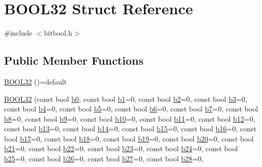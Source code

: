 \hypertarget{struct_b_o_o_l32}{}\section{B\+O\+O\+L32 Struct Reference}
\label{struct_b_o_o_l32}


{\ttfamily \#include $<$bitbool.\+h$>$}

\subsection*{Public Member Functions}
\begin{DoxyCompactItemize}
\item 
\hyperlink{struct_b_o_o_l32_ab77067628ae79e5356d4d07379defee4}{B\+O\+O\+L32} ()=default
\item 
\hyperlink{struct_b_o_o_l32_a5c3dbffb73954a8f6e118b071893c8df}{B\+O\+O\+L32} (const bool \hyperlink{struct_b_o_o_l32_a695f2ea79d7f3143cefe5391ee1ca0bc}{b0}, const bool \hyperlink{struct_b_o_o_l32_a7e9669f351570749facee83d076f9bc0}{b1}=0, const bool \hyperlink{struct_b_o_o_l32_a640276807605e096aad087624eb203d6}{b2}=0, const bool \hyperlink{struct_b_o_o_l32_a480f658333eb1eed7f831bd4d36beeb5}{b3}=0, const bool \hyperlink{struct_b_o_o_l32_abe1252ff43beedc42e030a2186f52de7}{b4}=0, const bool \hyperlink{struct_b_o_o_l32_a399fa4b7132061ae10294e80a53a2829}{b5}=0, const bool \hyperlink{struct_b_o_o_l32_a261bb3f36714d66a0f49af0fc2aff1a3}{b6}=0, const bool \hyperlink{struct_b_o_o_l32_a8b6f23bb5831d6e4da5efd5ffbfabfef}{b7}=0, const bool \hyperlink{struct_b_o_o_l32_a8904bddd286d03287c00c64ce331cfec}{b8}=0, const bool \hyperlink{struct_b_o_o_l32_aa20759c864674ee2b2b5370a5eac753d}{b9}=0, const bool \hyperlink{struct_b_o_o_l32_a405fbb96cd9be504fc3ad6b46d663ed0}{b10}=0, const bool \hyperlink{struct_b_o_o_l32_abb5f609784efd1ce95411de3dc711256}{b11}=0, const bool \hyperlink{struct_b_o_o_l32_a94c02cc91134cb40f4891f99991c0169}{b12}=0, const bool \hyperlink{struct_b_o_o_l32_aa9b6491afa3cb93436211ead5dd72757}{b13}=0, const bool \hyperlink{struct_b_o_o_l32_a1dc97f98eebbfbba891b0685d80530a0}{b14}=0, const bool \hyperlink{struct_b_o_o_l32_aa8c7112f2b0e1a8cc5ce8f9539b7d245}{b15}=0, const bool \hyperlink{struct_b_o_o_l32_a6e5640d7a5ba9ece502f2b5b9a2349c3}{b16}=0, const bool \hyperlink{struct_b_o_o_l32_a954eb2fcf4d281b206d8e99ba1740ee9}{b17}=0, const bool \hyperlink{struct_b_o_o_l32_ae0a4d950647d4fac9cb20f7e29516bc6}{b18}=0, const bool \hyperlink{struct_b_o_o_l32_aefb41a8da65649ab100c79563185fb72}{b19}=0, const bool \hyperlink{struct_b_o_o_l32_aff33443afd6538991cf18479f3869adb}{b20}=0, const bool \hyperlink{struct_b_o_o_l32_a74c9adb5c81e2174331072bca9318e31}{b21}=0, const bool \hyperlink{struct_b_o_o_l32_afdbfecb548cd8afe357ee6bebfbb324d}{b22}=0, const bool \hyperlink{struct_b_o_o_l32_a952f91aa93fd5d7aade9a56845dc4de6}{b23}=0, const bool \hyperlink{struct_b_o_o_l32_a193404178c473bf772487056eda4bd51}{b24}=0, const bool \hyperlink{struct_b_o_o_l32_a0baa46107d9d3cf247a19f67d7605262}{b25}=0, const bool \hyperlink{struct_b_o_o_l32_afaf6c339774439448615ccb5fe503983}{b26}=0, const bool \hyperlink{struct_b_o_o_l32_a69a730eb737496da415265ec0666e380}{b27}=0, const bool \hyperlink{struct_b_o_o_l32_a50f78f63a2dcf3c861918d07a887f80d}{b28}=0, 
\end{DoxyCompactItemize}
